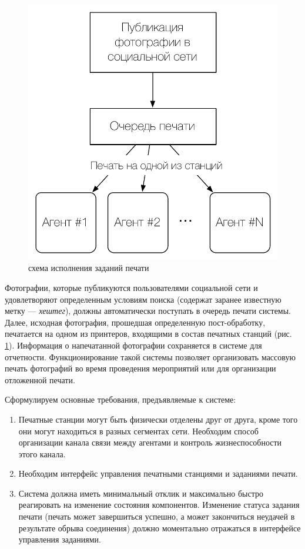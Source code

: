 \documentclass[a4paper,14pt,href,draft]{article}
\begin{document}
\begin{figure}[htbp]
\begin{center}
  \includegraphics[scale=0.7]{print-schema.pdf}
    \caption{схема исполнения заданий печати}
    \label{fig:PrintSchema}
\end{center}
\end{figure}

Фотографии, которые публикуются пользователями социальной сети и удовлетворяют определенным условиям поиска
(содержат заранее известную метку --- \textit{хештег}), должны автоматически поступать в очередь печати системы.
Далее, исходная фотография, прошедшая определенную пост-обработку, печатается на одном из принтеров, входящими в
состав печатных станций (рис. \ref{fig:PrintSchema}). Информация о напечатанной фотографии сохраняется в системе для
отчетности. Функционирование такой системы позволяет организовать массовую печать фотографий во время проведения
мероприятий или для организации отложенной печати.

Сформулируем основные требования, предъявляемые к системе:
\begin{enumerate}
  \item Печатные станции могут быть физически отделены друг от друга, кроме того они могут находиться в разных
  сегментах сети. Необходим способ организации канала связи между агентами и контроль жизнеспособности этого канала.

  \item Необходим интерфейс управления печатными станциями и заданиями печати.

  \item Система должна иметь минимальный отклик и максимально быстро реагировать на изменение состояния компонентов.
  Изменение статуса задания печати (печать может завершиться успешно, а может закончиться неудачей в результате
  обрыва соединения) должно моментально отражаться в интерфейсе управления заданиями.
\end{enumerate}
\end{document}
